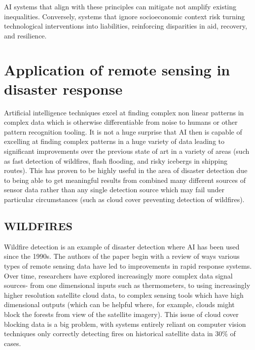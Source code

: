 \documentclass[conference,a4paper]{IEEEtran}
\begin{document}
AI systems that align with these principles can mitigate not amplify existing inequalities. Conversely, systems that ignore socioeconomic context risk turning technological interventions into liabilities, reinforcing disparities in aid, recovery, and resilience.


\section{Application of remote sensing in disaster response}


Artificial intelligence techniques excel at finding complex non linear patterns in complex data which is otherwise differentiable from noise to humans or other pattern recognition tooling. It is not a huge surprise that AI then is capable of excelling at finding complex patterns in a huge variety of data leading to significant improvements over the previous state of art in a variety of areas (such as fast detection of wildfires, flash flooding, and risky icebergs in shipping routes). This has proven to be highly useful in the area of disaster detection due to being able to get meaningful results from combined many different sources of sensor data rather than any single detection source which may fail under particular circumstances (such as cloud cover preventing detection of wildfires).


\subsection{WILDFIRES}

Wildfire detection is an example of disaster detection where AI has been used since the 1990s. The authors of the paper begin with a review of ways various types of remote sensing data have led to improvements in rapid response systems. Over time, researchers have explored increasingly more complex data signal sources- from one dimensional inputs such as thermometers, to using increasingly higher resolution satellite cloud data, to complex sensing tools which have high dimensional outputs (which can be helpful where, for example, clouds might block the forests from view of the satellite imagery). This issue of cloud cover blocking data is a big problem, with systems entirely reliant on computer vision techniques only correctly detecting fires on historical satellite data in 30\% of cases.
\end{document}
